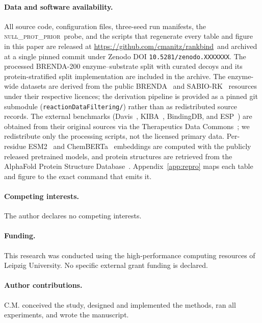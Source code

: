 \documentclass[11pt,a4paper]{article}
\newcommand{\nullprior}{\textsc{null\_prot\_prior}\xspace}
\newcommand{\repourl}{\url{https://github.com/cmanitz/rankbind}}
\newcommand{\zenododoi}{10.5281/zenodo.XXXXXXX}
\begin{document}
\paragraph{Data and software availability.}
All source code, configuration files, three-seed run manifests, the
\nullprior\ probe, and the scripts that regenerate every table and
figure in this paper are released at \repourl\ and archived at a single
pinned commit under Zenodo DOI \texttt{\zenododoi}. The processed
BRENDA-200 enzyme--substrate split with curated decoys and its
protein-stratified split implementation are included in the archive. The
enzyme-wide datasets are derived from the public BRENDA~\citep{chang2021brenda}
and SABIO-RK~\citep{wittig2018sabiork} resources under their respective
licences; the derivation pipeline is provided as a pinned git submodule
(\texttt{reactionDataFiltering/}) rather than as redistributed source
records. The external benchmarks (Davis~\citep{davis2011kinase},
KIBA~\citep{tang2014kiba}, BindingDB, and ESP~\citep{kroll2023esp}) are
obtained from their original sources via the Therapeutics Data
Commons~\citep{huang2021tdc}; we redistribute only the processing
scripts, not the licensed primary data. Per-residue ESM2~\citep{lin2023esm2}
and ChemBERTa~\citep{chithrananda2020chemberta} embeddings are computed
with the publicly released pretrained models, and protein structures are
retrieved from the AlphaFold Protein Structure
Database~\citep{jumper2021alphafold}. Appendix~\ref{app:repro} maps each
table and figure to the exact command that emits it.

\paragraph{Competing interests.}
The author declares no competing interests.

\paragraph{Funding.}
This research was conducted using the high-performance computing
resources of Leipzig University. No specific external grant funding is
declared.

\paragraph{Author contributions.}
C.M. conceived the study, designed and implemented the methods, ran all
experiments, and wrote the manuscript.
\end{document}
